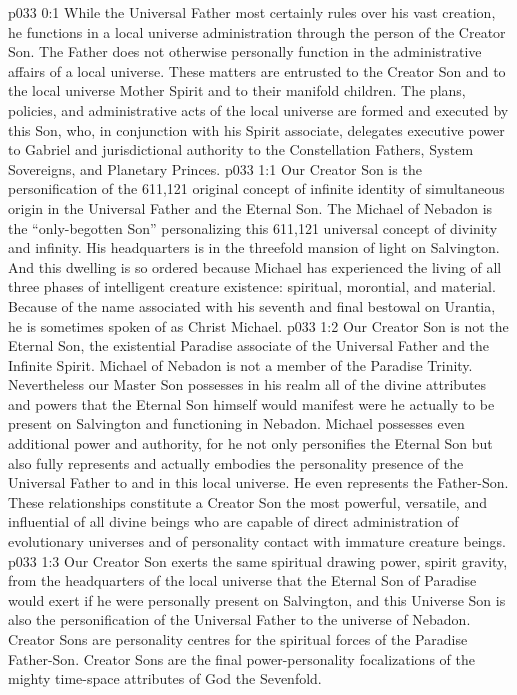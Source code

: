 \author{Chief of Archangels}
\vs p033 0:1 While the Universal Father most certainly rules over his vast creation, he functions in a local universe administration through the person of the Creator Son. The Father does not otherwise personally function in the administrative affairs of a local universe. These matters are entrusted to the Creator Son and to the local universe Mother Spirit and to their manifold children. The plans, policies, and administrative acts of the local universe are formed and executed by this Son, who, in conjunction with his Spirit associate, delegates executive power to Gabriel and jurisdictional authority to the Constellation Fathers, System Sovereigns, and Planetary Princes.
\vs p033 1:1 Our Creator Son is the personification of the 611,121 original concept of infinite identity of simultaneous origin in the Universal Father and the Eternal Son. The Michael of Nebadon is the “only\hyp{}begotten Son” personalizing this 611,121 universal concept of divinity and infinity. His headquarters is in the threefold mansion of light on Salvington. And this dwelling is so ordered because Michael has experienced the living of all three phases of intelligent creature existence: spiritual, morontial, and material. Because of the name associated with his seventh and final bestowal on Urantia, he is sometimes spoken of as Christ Michael.
\vs p033 1:2 Our Creator Son is not the Eternal Son, the existential Paradise associate of the Universal Father and the Infinite Spirit. Michael of Nebadon is not a member of the Paradise Trinity. Nevertheless our Master Son possesses in his realm all of the divine attributes and powers that the Eternal Son himself would manifest were he actually to be present on Salvington and functioning in Nebadon. Michael possesses even additional power and authority, for he not only personifies the Eternal Son but also fully represents and actually embodies the personality presence of the Universal Father to and in this local universe. He even represents the Father\hyp{}Son. These relationships constitute a Creator Son the most powerful, versatile, and influential of all divine beings who are capable of direct administration of evolutionary universes and of personality contact with immature creature beings.
\vs p033 1:3 Our Creator Son exerts the same spiritual drawing power, spirit gravity, from the headquarters of the local universe that the Eternal Son of Paradise would exert if he were personally present on Salvington, and  this Universe Son is also the personification of the Universal Father to the universe of Nebadon. Creator Sons are personality centres for the spiritual forces of the Paradise Father\hyp{}Son. Creator Sons are the final power\hyp{}personality focalizations of the mighty time\hyp{}space attributes of God the Sevenfold.

